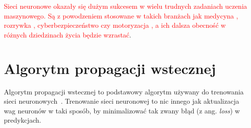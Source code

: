 \textcolor{red}{Sieci neuronowe okazały się dużym sukcesem w wielu trudnych zadaniach uczenia maszynowego.
Są z powodzeniem stosowane w takich branżach jak medycyna \cite{medicine_applications}, rozrywka \cite{netflix_applications}, cyberbezpieczeństwo \cite{cybersecurity_applications} czy motoryzacja \cite{automotive_applications}, a ich dalsza obecność w różnych dziedzinach życia będzie wzrastać}.


\section{Algorytm propagacji wstecznej}

Algorytm propagacji wstecznej to podstawowy algorytm używany do trenowania sieci neuronowych~\cite{geron}.
Trenowanie sieci neuronowej to nic innego jak aktualizacja wag neuronów w taki sposób, by minimalizować tak zwany błąd (z ang. \textit{loss}) w predykcjach.

